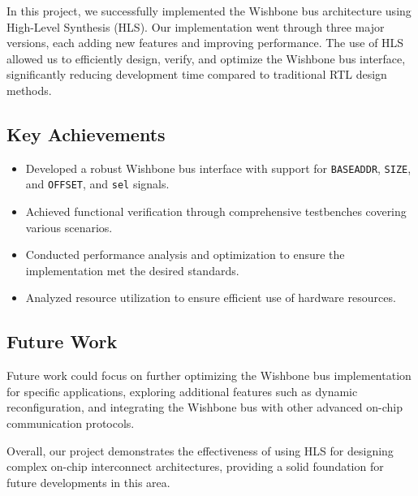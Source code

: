\documentclass[12pt]{report}
\begin{document}
In this project, we successfully implemented the Wishbone bus architecture using High-Level Synthesis (HLS). Our implementation went through three major versions, each adding new features and improving performance. The use of HLS allowed us to efficiently design, verify, and optimize the Wishbone bus interface, significantly reducing development time compared to traditional RTL design methods.

\subsection{Key Achievements}
\begin{itemize}
    \item Developed a robust Wishbone bus interface with support for \texttt{BASEADDR}, \texttt{SIZE}, and \texttt{OFFSET}, and \texttt{sel} signals.
    \item Achieved functional verification through comprehensive testbenches covering various scenarios.
    \item Conducted performance analysis and optimization to ensure the implementation met the desired standards.
    \item Analyzed resource utilization to ensure efficient use of hardware resources.
\end{itemize}

\subsection{Future Work}
Future work could focus on further optimizing the Wishbone bus implementation for specific applications, exploring additional features such as dynamic reconfiguration, and integrating the Wishbone bus with other advanced on-chip communication protocols.

Overall, our project demonstrates the effectiveness of using HLS for designing complex on-chip interconnect architectures, providing a solid foundation for future developments in this area.





\newpage
\printbibliography[title={References}, resetnumbers=true, heading=subbibliography]
\clearpage
\end{document}
